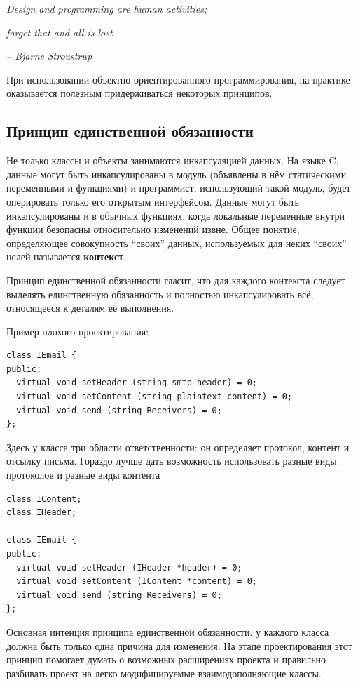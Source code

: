 \documentclass[a4paper,12pt,oneside]{book}
\begin{document}
\hfill\textit{Design and programming are human activities;}

\hfill\textit{forget that and all is lost}{\vspace{0.5em}}

\hfill\textit{-- Bjarne Stroustrup}

При использовании объектно ориентированного программирования, на практике оказывается полезным придерживаться некоторых принципов.

\subsection{Принцип единственной обязанности}\label{SRP}

Не только классы и объекты занимаются инкапсуляцией данных. На языке C, данные могут быть инкапсулированы в модуль (объявлены в нём статическими переменными и функциями) и программист, использующий такой модуль, будет оперировать только его открытым интерфейсом. Данные могут быть инкапсулированы и в обычных функциях, когда локальные переменные внутри функции безопасны относительно изменений извне. Общее понятие, определяющее совокупность ``своих'' данных, используемых для неких ``своих'' целей называется \textbf{контекст}.

Принцип единственной обязанности гласит, что для каждого контекста следует выделять единственную обязанность и полностью инкапсулировать всё, относящееся к деталям её выполнения.

Пример плохого проектирования:

\begin{lstlisting}
class IEmail {
public:
  virtual void setHeader (string smtp_header) = 0;
  virtual void setContent (string plaintext_content) = 0;
  virtual void send (string Receivers) = 0;
};
\end{lstlisting}

Здесь у класса три области ответственности: он определяет протокол, контент и отсылку письма. Гораздо лучше дать возможность использовать разные виды протоколов и разные виды контента

\begin{lstlisting}
class IContent;
class IHeader;

class IEmail {
public:
  virtual void setHeader (IHeader *header) = 0;
  virtual void setContent (IContent *content) = 0;
  virtual void send (string Receivers) = 0;
};
\end{lstlisting}

Основная интенция принципа единственной обязанности: у каждого класса должна быть только одна причина для изменения. На этапе проектирования этот принцип помогает думать о возможных расширениях проекта и правильно разбивать проект на легко модифицируемые взаимодополняющие классы.
\end{document}
